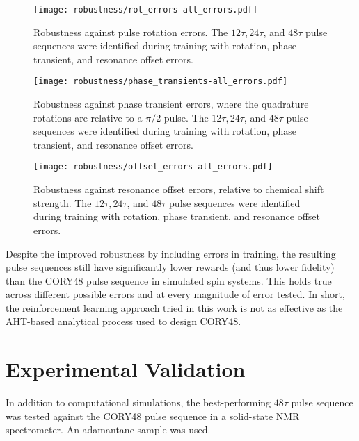 \begin{figure}[H]
    \centering
    \texttt{[image: robustness/rot\_errors-all\_errors.pdf]}
    \caption{
    Robustness against pulse rotation errors. The $12\tau, 24\tau$, and $48\tau$ pulse sequences were identified during training with rotation, phase transient, and resonance offset errors.
    }
    \label{fig:rot_errors-all_errors}
\end{figure}

\begin{figure}[H]
    \centering
    \texttt{[image: robustness/phase\_transients-all\_errors.pdf]}
    \caption{
    Robustness against phase transient errors, where the quadrature rotations are relative to a $\pi/2$-pulse. The $12\tau, 24\tau$, and $48\tau$ pulse sequences were identified during training with rotation, phase transient, and resonance offset errors.
    }
    \label{fig:phase_transients-all_errors}
\end{figure}

\begin{figure}[H]
    \centering
    \texttt{[image: robustness/offset\_errors-all\_errors.pdf]}
    \caption{
    Robustness against resonance offset errors, relative to chemical shift strength. The $12\tau, 24\tau$, and $48\tau$ pulse sequences were identified during training with rotation, phase transient, and resonance offset errors.
    }
    \label{fig:offset_errors-all_errors}
\end{figure}

Despite the improved robustness by including errors in training, the resulting pulse sequences still have significantly lower rewards (and thus lower fidelity) than the CORY48 pulse sequence in simulated spin systems. This holds true across different possible errors and at every magnitude of error tested. In short, the reinforcement learning approach tried in this work is not as effective as the AHT-based analytical process used to design CORY48.



\section{Experimental Validation}\label{sec:experimental}

In addition to computational simulations, the best-performing $48\tau$ pulse sequence was tested against the CORY48 pulse sequence in a solid-state NMR spectrometer.
An adamantane sample was used.

